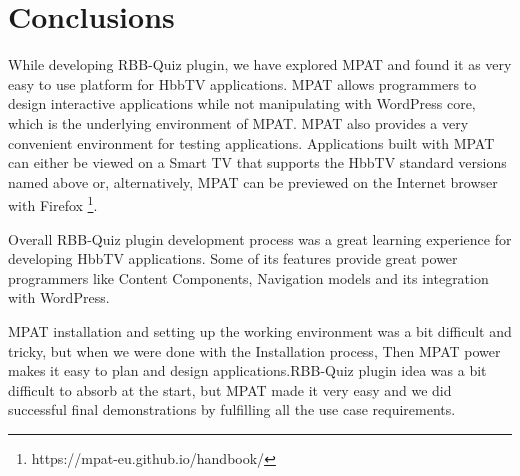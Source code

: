\section{\textbf{Conclusions}}\label{sec:conclusions}

While developing RBB-Quiz plugin, we have explored
MPAT and found it as very easy to use platform for HbbTV
applications. MPAT allows programmers to design interactive
applications while not manipulating with WordPress core,
which is the underlying environment of MPAT. MPAT also
provides a very convenient environment for testing applications.
Applications built with MPAT can either be viewed on
a Smart TV that supports the HbbTV standard versions named
above or, alternatively, MPAT can be previewed on the Internet
browser with Firefox  \footnote{https://mpat-eu.github.io/handbook/}.

 

Overall RBB-Quiz plugin development process was a great
learning experience for developing HbbTV applications. Some
of its features provide great power programmers like Content
Components, Navigation models and its integration with
WordPress\cite{handbook}.




MPAT installation and setting up the working environment
was a bit difficult and tricky, but when we were done with
the Installation process, Then MPAT power makes it easy to
plan and design applications.RBB-Quiz plugin idea was a bit
difficult to absorb at the start, but MPAT made it very easy
and we did successful final demonstrations by fulfilling all the
use case requirements.